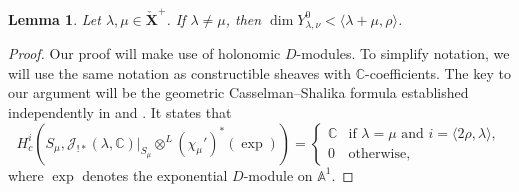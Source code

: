 \documentclass{amsart}
\newcommand{\C}{\mathbb{C}}
\newcommand{\A}{\mathbb{A}}
\newcommand{\scrJ}{\mathcal{J}}
\newcommand{\bfXv}{\check{\mathbf{X}}}
\newtheorem{lemma}[subsubsection]{Lemma}
\theoremstyle{definition}
\begin{document}
    \begin{lemma}\label{lem:dim_Y_lambda_nu_0}
        Let $\lambda, \mu \in \bfXv^+$. If $\lambda \neq \mu$, then $\dim Y_{\lambda, \nu}^0 < \langle \lambda + \mu, \rho \rangle$.
    \end{lemma}
    \begin{proof}
        Our proof will make use of holonomic $D$-modules. 
        To simplify notation, we will use the same notation as constructible sheaves with $\C$-coefficients.
        The key to our argument will be the geometric Casselman--Shalika formula established independently in \cite{NP} and \cite{FGV}.
        It states that
        \begin{equation}\label{eq:gcsf}
            H_c^i (S_{\mu}, \scrJ_{!*} (\lambda, \C)\vert_{S_{\mu}} \otimes^L (\chi_{\mu}')^* (\exp)) = \begin{cases}\C & \text{if }\lambda = \mu \text{ and } i = \langle 2\rho, \lambda \rangle, \\ 0 & \text{otherwise,}\end{cases}
        \end{equation}
        where $\exp$ denotes the exponential $D$-module on $\A^1$.


\end{proof}
\end{document}

